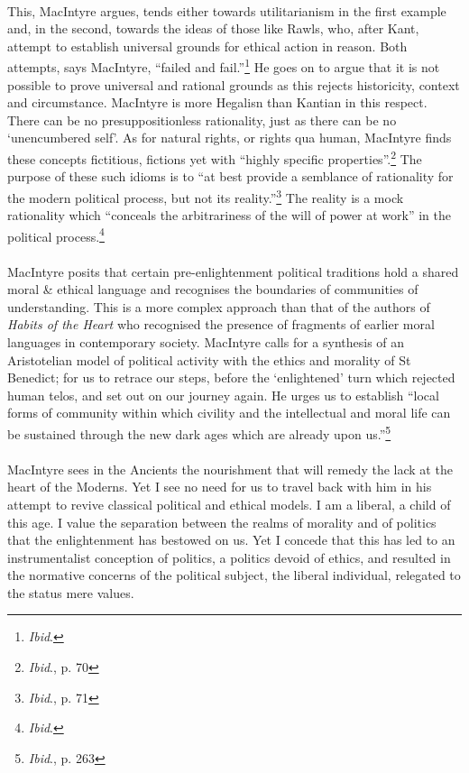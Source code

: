 \documentclass[12pt,a4paper,titlepage]{article}
\begin{document}
\paragraph{}This, MacIntyre argues, tends either towards utilitarianism in the first example and, in the second, towards the ideas of those like Rawls, who, after Kant, attempt to establish universal grounds for ethical action in reason. Both attempts, says MacIntyre, ``failed and fail.''\footnote{\textit{Ibid}.} He goes on to argue that it is not possible to prove universal and rational grounds as this rejects historicity, context and circumstance. MacIntyre is more Hegalisn than Kantian in this respect. There can be no presuppositionless rationality, just as there can be no `unencumbered self'. As for natural rights, or rights qua human, MacIntyre finds these concepts fictitious, fictions yet with ``highly specific properties''.\footnote{\textit{Ibid}., p. 70} The purpose of these such idioms is to ``at best provide a semblance of rationality for the modern political process, but not its reality.''\footnote{\textit{Ibid}., p. 71} The reality is a mock rationality which ``conceals the arbitrariness of the will of power at work'' in the political process.\footnote{\textit{Ibid}.}

\paragraph{}MacIntyre posits that certain pre-enlightenment political traditions hold a shared moral \& ethical language and recognises the boundaries of communities of understanding. This is a more complex approach than that of the authors of \textit{Habits of the Heart} who recognised the presence of fragments of earlier moral languages in contemporary society. MacIntyre calls for a synthesis of an Aristotelian model of political activity with the ethics and morality of St Benedict; for us to retrace our steps, before the `enlightened' turn which rejected human telos, and set out on our journey again. He urges us to establish ``local forms of community within which civility and the intellectual and moral life can be sustained through the new dark ages which are already upon us.''\footnote{\textit{Ibid}., p. 263}

\paragraph{}MacIntyre sees in the Ancients the nourishment that will remedy the lack at the heart of the Moderns. Yet I see no need for us to travel back with him in his attempt to revive classical political and ethical models. I am a liberal, a child of this age. I value the separation between the realms of morality and of politics that the enlightenment has bestowed on us. Yet I concede that this has led to an instrumentalist conception of politics, a politics devoid of ethics, and resulted in the normative concerns of the political subject, the liberal individual, relegated to the status mere values.
\end{document}

